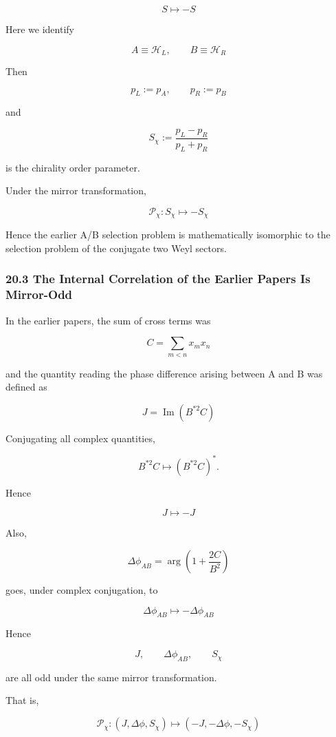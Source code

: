 \documentclass[
  a4paper,
]{article}
\begin{document}
\[
\boxed{
S\mapsto-S
}
\tag{152}
\]

Here we identify

\[
\boxed{
A\equiv\mathcal H_L,
\qquad
B\equiv\mathcal H_R
}
\tag{153}
\]

Then

\[
p_L:=p_A,
\qquad
p_R:=p_B
\]

and

\[
\boxed{
S_\chi
:=
\frac{p_L-p_R}{p_L+p_R}
}
\tag{154}
\]

is the chirality order parameter.

Under the mirror transformation,

\[
\boxed{
\mathcal P_\chi:
S_\chi\mapsto-S_\chi
}
\tag{155}
\]

Hence the earlier A/B selection problem is mathematically isomorphic to
the selection problem of the conjugate two Weyl sectors.

\subsubsection{20.3 The Internal Correlation of the Earlier Papers Is
Mirror-Odd}\label{the-internal-correlation-of-the-earlier-papers-is-mirror-odd}

In the earlier papers, the sum of cross terms was

\[
C
=
\sum_{m<n}x_mx_n
\]

and the quantity reading the phase difference arising between A and B
was defined as

\[
\boxed{
J
=
\operatorname{Im}
\left(
B^{*2}C
\right)
}
\tag{156}
\]

Conjugating all complex quantities,

\[
B^{*2}C
\mapsto
\left(B^{*2}C\right)^*.
\]

Hence

\[
\boxed{
J\mapsto-J
}
\tag{157}
\]

Also,

\[
\Delta\phi_{AB}
=
\arg
\left(
1+\frac{2C}{B^2}
\right)
\]

goes, under complex conjugation, to

\[
\boxed{
\Delta\phi_{AB}
\mapsto
-\Delta\phi_{AB}
}
\tag{158}
\]

Hence

\[
J,
\qquad
\Delta\phi_{AB},
\qquad
S_\chi
\]

are all odd under the same mirror transformation.

That is,

\[
\boxed{
\mathcal P_\chi:
(J,\Delta\phi,S_\chi)
\mapsto
(-J,-\Delta\phi,-S_\chi)
}
\tag{159}
\]
\end{document}
